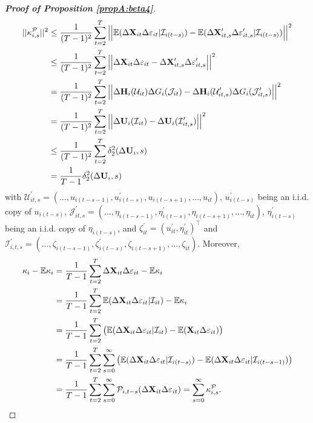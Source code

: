 \documentclass[a4paper,12pt]{article}
\begin{document}
\begin{proof}[\textnormal{\textbf{Proof of Proposition \ref{propA:beta4}}}]
\begin{align*}
||\kappa_{i, s}^{\mathcal{P}}||^2 &\leq \frac{1}{(T-1)^2} \sum_{t=2}^T \Big|\Big| \mathbb{E} (\Delta \mathbf{X}_{it}\Delta \varepsilon_{it}|\mathcal{I}_{i(t-s)}) -\mathbb{E} (\Delta \mathbf{X}_{it, s}^\prime\Delta \varepsilon_{it, s}^\prime|\mathcal{I}_{i(t-s)}) \Big|\Big|^2 \\
&\leq \frac{1}{(T-1)^2} \sum_{t=2}^T \Big|\Big| \Delta \mathbf{X}_{it}\Delta \varepsilon_{it} -\Delta \mathbf{X}_{it, s}^\prime\Delta \varepsilon_{it, s}^\prime\Big|\Big|^2 \\
& = \frac{1}{(T-1)^2} \sum_{t=2}^T \Big|\Big| \Delta \mathbf{H}_i(\mathcal{U}_{it})  \Delta G_i(\mathcal{J}_{it}) - \Delta \mathbf{H}_i(\mathcal{U}_{it, s}^\prime)  \Delta G_i(\mathcal{J}_{it, s}^\prime)\Big|\Big|^2\\
& = \frac{1}{(T-1)^2} \sum_{t=2}^T \Big|\Big| \Delta \mathbf{U}_i(\mathcal{I}_{it})  - \Delta \mathbf{U}_i(\mathcal{I}_{it, s}^\prime) \Big|\Big|^2 \\
& \leq \frac{1}{(T-1)^2} \sum_{t=2}^T \delta_2^2(\Delta \mathbf{U}_i, s)\\
& = \frac{1}{T-1}\delta_2^2(\Delta \mathbf{U}_i, s)
\end{align*}
with $\mathcal{U}_{it, s}^\prime = (\ldots, u_{i(t-s-1)}, u^\prime_{i(t-s)}, u_{i(t-s+1)}, \ldots, u_{it})$, $u_{i(t-s)}^\prime$ being an i.i.d. copy of $u_{i(t-s)}$, $\mathcal{J}_{it, s}^\prime = (\ldots, \eta_{i(t-s-1)}, \eta^\prime_{i(t-s)}, \eta_{i(t-s+1)}, \ldots, \eta_{it})$, $\eta_{i(t-s)}^\prime$ being an i.i.d. copy of $\eta_{i(t-s)}$, and $\zeta^\prime_{it} = (u_{it}^\prime, \eta_{it}^\prime)^\top$ and $\mathcal{I}_{i,t,s}^\prime =(\ldots, \zeta_{i(t-s-1)}, \zeta^\prime_{i(t-s)}, \zeta_{i(t-s+1)}, \ldots, \zeta_{it})$.
Moreover,
\begin{align*}
\kappa_i - \ex \kappa_i &= \frac{1}{T-1}\sum_{t=2}^T \Delta \mathbf{X}_{it}\Delta \varepsilon_{it} - \ex \kappa_i \\
&= \frac{1}{T-1}\sum_{t=2}^T \ex ( \Delta \mathbf{X}_{it}\Delta \varepsilon_{it}|\mathcal{I}_{it}) - \ex \kappa_i \\
&= \frac{1}{T-1}\sum_{t=2}^T \big( \ex ( \Delta \mathbf{X}_{it}\Delta \varepsilon_{it}|\mathcal{I}_{it} ) - \ex ( \mathbf{X}_{it}\Delta \varepsilon_{it}) \big) \\
&= \frac{1}{T-1}\sum_{t=2}^T \sum_{s=0}^\infty \big( \ex ( \Delta \mathbf{X}_{it}\Delta \varepsilon_{it}|\mathcal{I}_{i(t-s)} ) - \ex ( \Delta \mathbf{X}_{it}\Delta \varepsilon_{it}|\mathcal{I}_{i(t-s-1)} )  \big) \\
&= \frac{1}{T-1}\sum_{t=2}^T \sum_{s=0}^\infty \mathcal{P}_{i, t-s} (\Delta \mathbf{X}_{it}\Delta \varepsilon_{it}) = \sum_{s=0}^\infty \kappa_{i, s}^{\mathcal{P}}.

\end{align*}
\end{proof}
\end{document}
